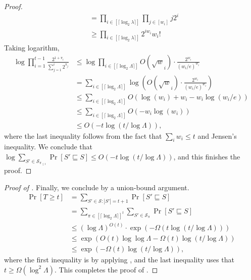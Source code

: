 \documentclass[11pt,letterpaper]{article}
\theoremstyle{plain}
\theoremstyle{definition}
\theoremstyle{remark}
\newcommand{\Spi}[1]{\ensuremath{\mathcal{S}_{\pi_{#1}}}\xspace}
\begin{document}
\begin{proof}
\begin{align*}
        &= \prod_{i \in [\lceil \log_2 \lambda \rceil]} \prod_{j  \in [w_i]} j 2^{i} \\
        &\geq \prod_{i \in [\lceil \log_2 \lambda \rceil]}  2^{i w_i} w_i!
    \end{align*}
    Taking logarithm,
    \begin{align*}
        \log 
        \prod_{i = 1}^{t - 1} \frac{2^{1 + \pi_{i}}}{\sum_{j=1}^{i} 2^{\pi_j}}
        &\leq \log \prod_{i \in [\lceil \log_2 \Lambda \rceil]} O(\sqrt w_i) \cdot \frac{ 2^{w_i} }{(w_i / e)^{w_i}} \\
        &= \sum_{i \in [\lceil \log_2 \Lambda \rceil]} \log\left( O(\sqrt w_i) \cdot \frac{2^{w_i}}{(w_i / e)^{w_i}} \right) \\
        &\leq \sum_{i \in [\lceil \log_2 \Lambda \rceil]} O( \log(w_i) + w_i - w_i\log(w_i / e) ) \\
        &\leq \sum_{i \in [\lceil \log_2 \Lambda \rceil]} O( - w_i\log(w_i) ) \\
        &\leq O(-t \log(t / \log \Lambda)),
    \end{align*}
    where the last inequality follows from the fact that $\sum_i w_i \leq t$ and Jensen's inequality.
    We conclude that $\log \sum_{S'\in \Spi{\leq t}}\Pr[S'\sqsubseteq S] \leq O(-t \log(t / \log \Lambda))$,
    and this finishes the proof.
\end{proof}


\begin{proof}[Proof of ]
Finally, we conclude  by a union-bound argument.
\begin{align*}
    \Pr[T\geq t]
    &= \sum_{S'\in \mathcal{S}:|S'| = t+1} \Pr[S'\sqsubseteq S] \\
    &= \sum_{\pi \in [\lceil \log_2 \Lambda \rceil]^{t}}\sum_{S'\in \mathcal{S}_{\pi}} \Pr[S'\sqsubseteq S] \\
    &\leq (\log\Lambda )^{O(t)} \cdot \exp(-\Omega(t \log(t / \log\Lambda))) \\
    &\leq \exp(O(t)\log\log \Lambda - \Omega(t) \log(t / \log \Lambda)) \\
    &\leq \exp(-\Omega(t) \log(t / \log \Lambda)),
\end{align*}
where the first inequality is by applying ,
and the last inequality uses that $t \geq \Omega(\log^2 \Lambda)$.
This completes the proof of .
\end{proof}
\end{document}
